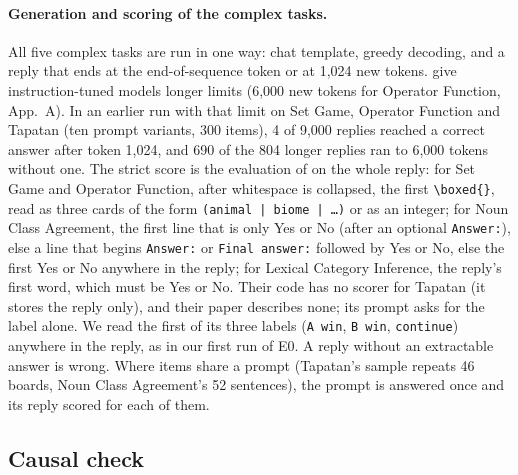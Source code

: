 \documentclass[11pt,a4paper]{article}
\begin{document}
\paragraph{Generation and scoring of the complex tasks.}\label{sec:reasoning} All five complex tasks are run in one way: chat template, greedy decoding, and a reply that ends at the end-of-sequence token or at 1,024 new tokens. \citeauthor{fu2026rules} give instruction-tuned models longer limits (6,000 new tokens for Operator Function, App.~A). In an earlier run with that limit on Set Game, Operator Function and Tapatan (ten prompt variants, 300 items), 4 of 9,000 replies reached a correct answer after token 1,024, and 690 of the 804 longer replies ran to 6,000 tokens without one. The strict score is the evaluation of \citet{fu2026rules} on the whole reply: for Set Game and Operator Function, after whitespace is collapsed, the first \texttt{\textbackslash boxed\{\}}, read as three cards of the form \texttt{(animal | biome | \ldots)} or as an integer; for Noun Class Agreement, the first line that is only Yes or No (after an optional \texttt{Answer:}), else a line that begins \texttt{Answer:} or \texttt{Final answer:} followed by Yes or No, else the first Yes or No anywhere in the reply; for Lexical Category Inference, the reply's first word, which must be Yes or No. Their code has no scorer for Tapatan (it stores the reply only), and their paper describes none; its prompt asks for the label alone. We read the first of its three labels (\texttt{A win}, \texttt{B win}, \texttt{continue}) anywhere in the reply, as in our first run of E0. A reply without an extractable answer is wrong. Where items share a prompt (Tapatan's sample repeats 46 boards, Noun Class Agreement's 52 sentences), the prompt is answered once and its reply scored for each of them.

\subsection{Causal check}\label{sec:causal-complex}
\end{document}
